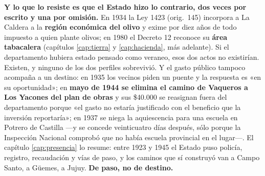 \textbf{Y lo que lo resiste es que el Estado hizo lo contrario, dos veces por escrito y una
por omisión.} En 1934 la Ley 1423 (orig.\ 145) incorpora a La Caldera a la \textbf{región económica del
olivo} y exime por diez años de todo impuesto a quien plante olivos; en 1980 el Decreto 12
reconoce su \textbf{área tabacalera} (capítulos \ref{cap:tierra} y \ref{cap:hacienda}, más adelante). Si el
departamento hubiera estado pensado como veraneo, esos dos actos no existirían. Existen, y
ninguno de los dos perfiles sobrevivió. Y el gasto público tampoco acompaña a un destino: en
1935 los vecinos piden un puente y la respuesta es «en su oportunidad»; en \textbf{mayo de 1944
se elimina el camino de Vaqueros a Los Yacones del plan de obras} y sus \$40.000 se reasignan
fuera del departamento porque «el gasto no estaría justificado con el beneficio que la
inversión reportaría»; en 1937 se niega la aquiescencia para una escuela en Potrero de
Castilla ---y se concede veinticuatro días después, sólo porque la Inspección Nacional
comprobó que no había escuela provincial en el lugar---. El capítulo \ref{cap:presencia} lo resume: entre 1923 y 1945 el Estado puso policía,
registro, recaudación y vías de paso, y los caminos que sí construyó van a Campo Santo, a
Güemes, a Jujuy. \textbf{De paso, no de destino.}

